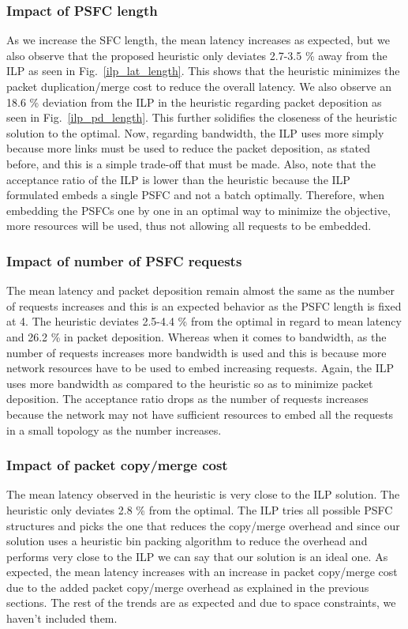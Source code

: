 \documentclass[journal]{IEEEtran}
\begin{document}
\subsubsection{Impact of PSFC length}
As we increase the SFC length, the mean latency increases as expected, but we also observe that the proposed heuristic only deviates 2.7-3.5 \% away from the ILP as seen in Fig.~\ref{ilp_lat_length}. This shows that the heuristic minimizes the packet duplication/merge cost to reduce the overall latency. We also observe an 18.6 \% deviation from the ILP in the heuristic regarding packet deposition as seen in Fig.~\ref{ilp_pd_length}. This further solidifies the closeness of the heuristic solution to the optimal. Now, regarding bandwidth, the ILP uses more simply because more links must be used to reduce the packet deposition, as stated before, and this is a simple trade-off that must be made. Also, note that the acceptance ratio of the ILP is lower than the heuristic because the ILP formulated embeds a single PSFC and not a batch optimally. Therefore, when embedding the PSFCs one by one in an optimal way to minimize the objective, more resources will be used, thus not allowing all requests to be embedded.

\subsubsection{Impact of number of PSFC requests}
The mean latency and packet deposition remain almost the same as the number of requests increases and this is an expected behavior as the PSFC length is fixed at 4. The heuristic deviates 2.5-4.4 \% from the optimal in regard to mean latency and 26.2 \% in packet deposition. Whereas when it comes to bandwidth, as the number of requests increases more bandwidth is used and this is because more network resources have to be used to embed increasing requests. Again, the ILP uses more bandwidth as compared to the heuristic so as to minimize packet deposition. The acceptance ratio drops as the number of requests increases because the network may not have sufficient resources to embed all the requests in a small topology as the number increases.

\subsubsection{Impact of packet copy/merge cost}
The mean latency observed in the heuristic is very close to the ILP solution. The heuristic only deviates 2.8 \% from the optimal. The ILP tries all possible PSFC structures and picks the one that reduces the copy/merge overhead and since our solution uses a heuristic bin packing algorithm to reduce the overhead and performs very close to the ILP we can say that our solution is an ideal one. As expected, the mean latency increases with an increase in packet copy/merge cost due to the added packet copy/merge overhead as explained in the previous sections. The rest of the trends are as expected and due to space constraints, we haven't included them.
\end{document}
